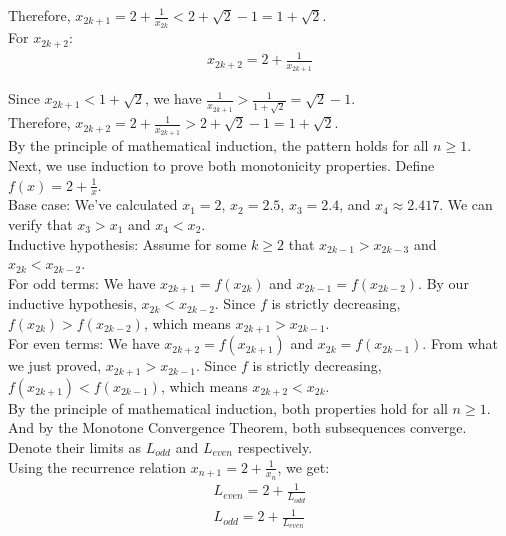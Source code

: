 \documentclass{article}
\begin{document}
Therefore, $x_{2k+1} = 2 + \frac{1}{x_{2k}} < 2 + \sqrt{2} - 1 = 1 + \sqrt{2}$. \\

For $x_{2k+2}$:
\begin{align*}
x_{2k+2} = 2 + \frac{1}{x_{2k+1}}
\end{align*}

Since $x_{2k+1} < 1 + \sqrt{2}$, we have $\frac{1}{x_{2k+1}} > \frac{1}{1 + \sqrt{2}} = \sqrt{2} - 1$. \\

Therefore, $x_{2k+2} = 2 + \frac{1}{x_{2k+1}} > 2 + \sqrt{2} - 1 = 1 + \sqrt{2}$. \\

By the principle of mathematical induction, the pattern holds for all $n \geq 1$. \\

Next, we use induction to prove both monotonicity properties. Define $f(x) = 2 + \frac{1}{x}$. \\

Base case: We've calculated $x_1 = 2$, $x_2 = 2.5$, $x_3 = 2.4$, and $x_4 \approx 2.417$.
We can verify that $x_3 > x_1$ and $x_4 < x_2$. \\

Inductive hypothesis: Assume for some $k \geq 2$ that $x_{2k-1} > x_{2k-3}$ and $x_{2k} < x_{2k-2}$. \\

For odd terms: We have $x_{2k+1} = f(x_{2k})$ and $x_{2k-1} = f(x_{2k-2})$.
By our inductive hypothesis, $x_{2k} < x_{2k-2}$.
Since $f$ is strictly decreasing, $f(x_{2k}) > f(x_{2k-2})$, which means $x_{2k+1} > x_{2k-1}$. \\

For even terms: We have $x_{2k+2} = f(x_{2k+1})$ and $x_{2k} = f(x_{2k-1})$.
From what we just proved, $x_{2k+1} > x_{2k-1}$.
Since $f$ is strictly decreasing, $f(x_{2k+1}) < f(x_{2k-1})$, which means $x_{2k+2} < x_{2k}$. \\

By the principle of mathematical induction, both properties hold for all $n \geq 1$. \\

And by the Monotone Convergence Theorem, both subsequences converge. Denote their limits as $L_{odd}$ and $L_{even}$ respectively. \\

Using the recurrence relation $x_{n+1} = 2 + \frac{1}{x_n}$, we get:
\begin{align*}
L_{even} = 2 + \frac{1}{L_{odd}} \\
L_{odd} = 2 + \frac{1}{L_{even}}
\end{align*}
\end{document}
